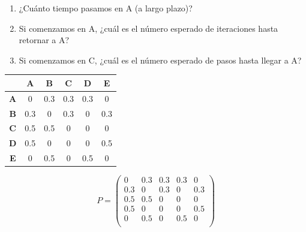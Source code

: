 \documentclass{templateNote}
\begin{document}
\begin{enumerate}
    \begin{enumerate}[label=\alph*)]
        \item ¿Cuánto tiempo pasamos en A (a largo plazo)?
        \item Si comenzamos en A, ¿cuál es el número esperado de iteraciones hasta retornar a A?
        \item Si comenzamos en C, ¿cuál es el número esperado de pasos hasta llegar a A?
    \end{enumerate}

    \begin{table}[H]
        \centering
        \begin{tabular}{|c|c|c|c|c|c|}
            \hline
            & \textbf{A} & \textbf{B} & \textbf{C} & \textbf{D} & \textbf{E} \\ \hline
            \textbf{A} & 0 & 0.3 & 0.3 & 0.3 & 0 \\
            \textbf{B} & 0.3 & 0 & 0.3 & 0 & 0.3 \\
            \textbf{C} & 0.5 & 0.5 & 0 & 0 & 0 \\
            \textbf{D} & 0.5 & 0 & 0 & 0 & 0.5 \\
            \textbf{E} & 0 & 0.5 & 0 & 0.5 & 0 \\
            \hline
        \end{tabular}
    \end{table}

    \begin{equation*}
        P =
        \begin{pmatrix}
            0 & 0.3 & 0.3 & 0.3 & 0 \\
            0.3 & 0 & 0.3 & 0 & 0.3 \\
            0.5 & 0.5 & 0 & 0 & 0 \\
            0.5 & 0 & 0 & 0 & 0.5 \\
            0 & 0.5 & 0 & 0.5 & 0 \\
        \end{pmatrix}
    \end{equation*}


\end{enumerate}
\end{document}
